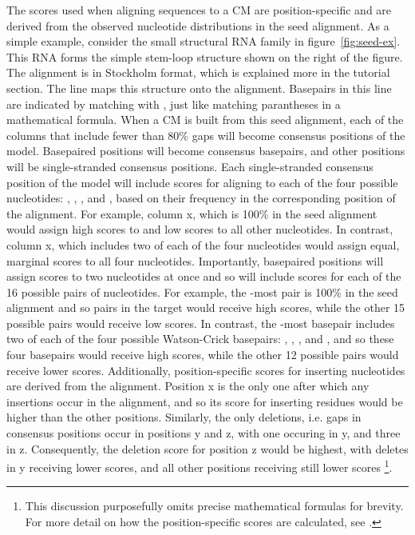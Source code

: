 The scores used when aligning sequences to a CM are position-specific
and are derived from the observed nucleotide distributions in the seed
alignment. As a simple example, consider the small structural RNA
family in figure~\ref{fig:seed-ex}. This RNA forms the simple stem-loop
structure shown on the right of the figure. The alignment is in
Stockholm format, which is explained more in the tutorial section. 
The  line maps this structure onto the
alignment. Basepairs in this line are indicated by matching \prog{<}
with \prog{>}, just like matching parantheses in a mathematical
formula. When a CM is built from this seed alignment, each of the
columns that include fewer than 80\% gaps will become consensus
positions of the model. Basepaired positions will become consensus
basepairs, and other positions will be single-stranded consensus
positions. Each single-stranded consensus position of the model will
include scores for aligning to each of the four possible nucleotides:
, , , and , based on their frequency
in the corresponding position of the alignment. For example, column x,
which is 100\%  in the seed alignment would assign high scores
to  and low scores to all other nucleotides. In contrast,
column x, which includes two of each of the four nucleotides would
assign equal, marginal scores to all four nucleotides.
Importantly, basepaired positions will
assign scores to two nucleotides at once and so will include scores
for each of the 16 possible pairs of nucleotides. For example, the
-most pair is 100\%  in the seed alignment and so 
pairs in the target would receive high scores, while the other 15
possible pairs would receive low scores. In contrast, the -most
basepair includes two of each of the four possible Watson-Crick
basepairs: , , , and , and so
these four basepairs would receive high scores, while the other 12
possible pairs would receive lower scores. Additionally,
position-specific scores for inserting nucleotides are derived from
the alignment. Position x is the only one after which any insertions
occur in the alignment, and so its score for inserting residues would
be higher than the other positions. Similarly, the only deletions,
i.e. gaps in consensus positions occur in positions y and z, with one
occuring in y, and three in z. Consequently, the deletion score for
position z would be highest, with deletes in y receiving lower scores,
and all other positions receiving still lower scores
\footnote{This discussion
  purposefully omits precise mathematical formulas for brevity. For
  more detail on how the position-specific scores are calculated, see 
  .}. 

